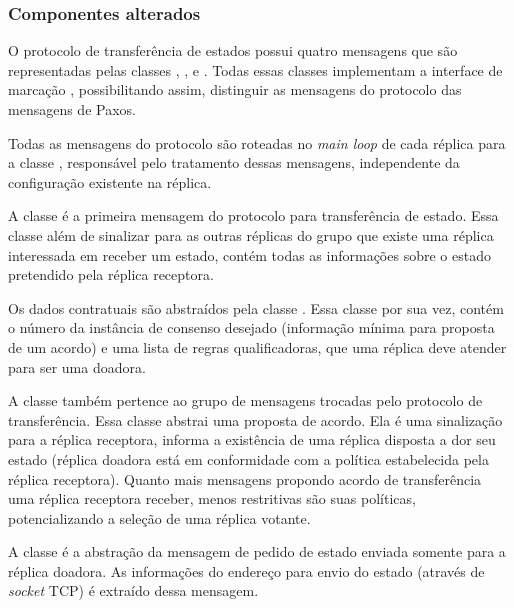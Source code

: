 \subsubsection{Componentes alterados}

O protocolo de transferência de estados possui quatro mensagens que são representadas
pelas classes , ,  e
. Todas essas classes implementam a interface de marcação
, possibilitando assim, distinguir as mensagens do
protocolo das mensagens de Paxos.

Todas as mensagens do protocolo são roteadas no \emph{main loop} de cada réplica para a
classe , responsável pelo tratamento dessas mensagens, independente da
configuração existente na réplica.


A classe  é a primeira mensagem do protocolo para transferência
de estado. Essa classe além de sinalizar para as outras réplicas do grupo que existe uma
réplica interessada em receber um estado, contém todas as informações sobre o estado
pretendido pela réplica receptora.

Os dados contratuais são abstraídos pela classe . Essa classe por sua
vez, contém o número da instância de consenso desejado (informação mínima para proposta de
um acordo) e uma lista de regras qualificadoras, que uma réplica deve atender para ser uma
doadora.


A classe  também pertence ao grupo de mensagens trocadas pelo
protocolo de transferência. Essa classe abstrai uma proposta de acordo. Ela é uma
sinalização para a réplica receptora, informa a existência de uma réplica disposta a dor
seu estado (réplica doadora está em conformidade com a política estabelecida pela réplica
receptora). Quanto mais mensagens propondo acordo de transferência uma réplica receptora
receber, menos restritivas são suas políticas, potencializando a seleção de uma réplica
votante.


A classe  é a abstração da mensagem de pedido de estado enviada
somente para a réplica doadora. As informações do endereço para envio do estado (através
de \emph{socket} TCP) é extraído dessa mensagem.

